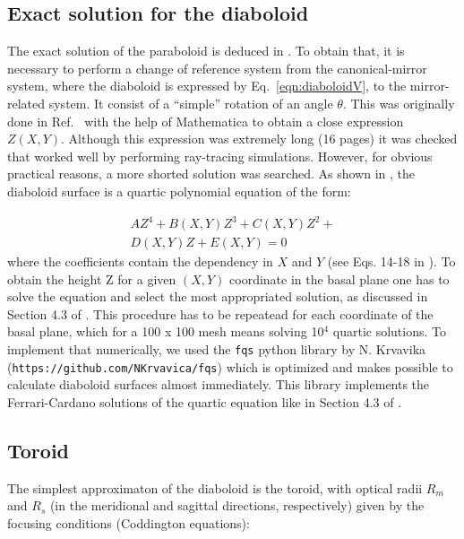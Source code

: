 \documentclass{iucr}              %
\newcommand{\inred}[1]{{\color{red}#1}}
\begin{document}
\subsection{Exact solution for the diaboloid}\label{sec:diaboloidexact}
\inred{
The exact solution of the paraboloid is deduced in \cite{part2}. To obtain that, it is necessary to perform a change of reference system from the canonical-mirror system, where the diaboloid is expressed by Eq.~\ref{eqn:diaboloidV}, to the mirror-related system. It consist of a ``simple'' rotation of an angle $\theta$. This was originally done in Ref.~\cite{Valeriy2020a} with the help of Mathematica to obtain a close expression $Z(X,Y)$. Although this expression was extremely long (16 pages) it was checked that worked well by performing ray-tracing simulations. However, for obvious practical reasons, a more shorted solution was searched. As shown in \cite{part2}, the diaboloid surface is a quartic polynomial equation of the form: 


\begin{multline}
\label{eqn:quartic}
A Z^4 + 
B(X,Y) Z^3 + 
C(X,Y) Z^2 + \\
D(X,Y) Z + E(X,Y) = 0 
\end{multline}
where the coefficients contain the dependency in $X$ and $Y$ (see Eqs. 14-18 in \cite{part2}). To obtain the height Z for a given $(X,Y)$ coordinate in the basal plane one has to solve the equation and select the most appropriated solution, as discussed in Section 4.3 of \cite{part2}. This procedure has to be repeatead for each coordinate of the basal plane, which for a 100 x 100 mesh means solving 10$^4$ quartic solutions. To implement that numerically, we used the {\tt fqs} python library by N. Krvavika ({\tt https://github.com/NKrvavica/fqs}) which is optimized and makes possible to calculate diaboloid surfaces almost immediately. This library implements the Ferrari-Cardano solutions of the quartic equation like in Section 4.3 of \cite{part2}. 


}


\subsection{Toroid}\label{sec:toroid}
The simplest approximaton of the diaboloid is the toroid, with optical radii $R_m$ and $R_s$ (in the meridional and sagittal directions, respectively) given by the focusing conditions (Coddington equations): 
\end{document}
